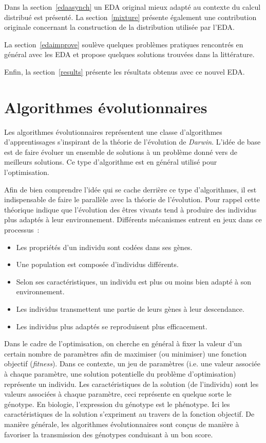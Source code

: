 \documentclass[a4paper, 11pt]{report}
\begin{document}
Dans la section~\ref{edaasynch} un EDA original mieux adapté au contexte du calcul distribué est présenté. La section~\ref{mixture} présente également une contribution originale concernant la construction de la distribution utilisée par l'EDA.

La section~\ref{edaimprove} soulève quelques problèmes pratiques rencontrés en général avec les EDA et propose quelques solutions trouvées dans la littérature.

Enfin, la section~\ref{results} présente les résultats obtenus avec ce nouvel EDA.

\section{Algorithmes évolutionnaires}
\label{evointro}
Les algorithmes évolutionnaires représentent une classe d'algorithmes d'apprentissages s'inspirant de la théorie de l'évolution de \textit{Darwin}. L'idée de base est de faire évoluer un ensemble de solutions à un problème donné vers de meilleurs solutions. Ce type d'algorithme est en général utilisé pour l'optimisation.

Afin de bien comprendre l'idée qui se cache derrière ce type d'algorithmes, il est indispensable de faire le parallèle avec la théorie de l'évolution. Pour rappel cette théorique indique que l'évolution des êtres vivants tend à produire des individus plus adaptés à leur environnement. Différents mécanismes entrent en jeux dans ce processus~\cite{WIKI_EVO}:
\begin{itemize}
\item Les propriétés d'un individu sont codées dans ses gènes.
\item Une population est composée d'individus différents.
\item Selon ses caractéristiques, un individu est plus ou moins bien adapté à son environnement.
\item Les individus transmettent une partie de leurs gènes à leur descendance.
\item Les individus plus adaptés se reproduisent plus efficacement.
\end{itemize}

Dans le cadre de l'optimisation, on cherche en général à fixer la valeur d'un certain nombre de paramètres afin de maximiser (ou minimiser) une fonction objectif (\textit{fitness}). Dans ce contexte, un jeu de paramètres (i.e. une valeur associée à chaque paramètre, une solution potentielle du problème d'optimisation) représente un individu. Les caractéristiques de la solution (de l'individu) sont les valeurs associées à chaque paramètre, ceci représente en quelque sorte le génotype. En biologie, l'expression du génotype est le phénotype. Ici les caractéristiques de la solution s'expriment au travers de la fonction objectif. De manière générale, les algorithmes évolutionnaires sont conçus de manière à favoriser la transmission des génotypes conduisant à un bon score.  
\end{document}
